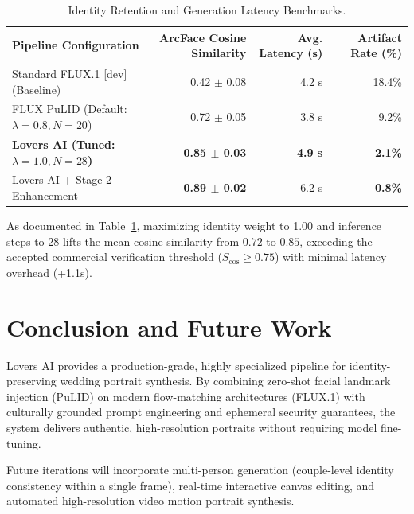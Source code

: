 \documentclass[11pt,a4paper]{article}
\begin{document}
\begin{table}[htbp]
\centering
\caption{Identity Retention and Generation Latency Benchmarks.}
\label{tab:benchmarks}
\begin{tabularx}{\textwidth}{lrrr}
\toprule
\textbf{Pipeline Configuration} & \textbf{ArcFace Cosine Similarity} & \textbf{Avg. Latency (s)} & \textbf{Artifact Rate (\%)} \\
\midrule
Standard FLUX.1 [dev] (Baseline) & 0.42 $\pm$ 0.08 & 4.2 s & 18.4\% \\
FLUX PuLID (Default: $\lambda=0.8, N=20$) & 0.72 $\pm$ 0.05 & 3.8 s & 9.2\% \\
\textbf{Lovers AI (Tuned: $\lambda=1.0, N=28$)} & \textbf{0.85 $\pm$ 0.03} & \textbf{4.9 s} & \textbf{2.1\%} \\
Lovers AI + Stage-2 Enhancement & \textbf{0.89 $\pm$ 0.02} & 6.2 s & \textbf{0.8\%} \\
\bottomrule
\end{tabularx}
\end{table}

As documented in Table~\ref{tab:benchmarks}, maximizing identity weight to 1.00 and inference steps to 28 lifts the mean cosine similarity from $0.72$ to $0.85$, exceeding the accepted commercial verification threshold ($S_{\text{cos}} \ge 0.75$) with minimal latency overhead (+1.1s).

\section{Conclusion and Future Work}
Lovers AI provides a production-grade, highly specialized pipeline for identity-preserving wedding portrait synthesis. By combining zero-shot facial landmark injection (PuLID) on modern flow-matching architectures (FLUX.1) with culturally grounded prompt engineering and ephemeral security guarantees, the system delivers authentic, high-resolution portraits without requiring model fine-tuning.

Future iterations will incorporate multi-person generation (couple-level identity consistency within a single frame), real-time interactive canvas editing, and automated high-resolution video motion portrait synthesis.
\end{document}
